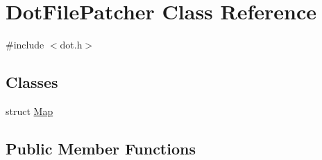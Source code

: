 \hypertarget{class_dot_file_patcher}{}\section{Dot\+File\+Patcher Class Reference}
\label{class_dot_file_patcher}


{\ttfamily \#include $<$dot.\+h$>$}

\subsection*{Classes}
\begin{DoxyCompactItemize}
\item 
struct \mbox{\hyperlink{struct_dot_file_patcher_1_1_map}{Map}}
\end{DoxyCompactItemize}
\subsection*{Public Member Functions}
